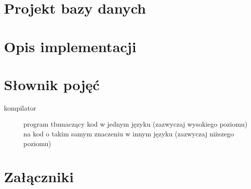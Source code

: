\documentclass[11pt,oneside,a4paper,titlepage,onecolumn]{article}
\begin{document}
\section{Projekt bazy danych}



\section{Opis implementacji}


\section{Słownik pojęć}

\begin{description}
    \item[kompilator] program tłumaczący kod w jednym języku (zazwyczaj wysokiego poziomu) na kod o takim
        samym znaczeniu w innym języku (zazwyczaj niższego poziomu)
   
\end{description}

\section{Załączniki}
\end{document}
